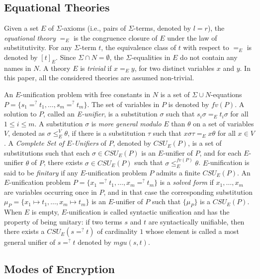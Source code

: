 \documentclass{easychair}
\newcommand{\CSU}[1]{\mathit{CSU_{#1}}}
\begin{document}
\subsection{Equational Theories}

Given a set $E$ of $\Sigma$-axioms (i.e., pairs of $\Sigma$-terms,
denoted by $l = r$), the \emph{equational theory} $=_E$ is the
congruence closure of $E$ under the law of substitutivity.  For any
$\Sigma$-term $t$, the equivalence class of $t$ with respect to $=_E$
is denoted by $[t]_E$. Since $\Sigma \cap N = \emptyset$, the 
$\Sigma$-equalities in $E$ do not contain any names in $N$.
A theory $E$ is
\emph{trivial} if $x=_E y$, for two distinct variables $x$ and $y$. In this
paper, all the considered theories are assumed non-trivial.

An $E$-unification problem with free constants in $N$ is a set of $\Sigma \cup N$-equations $P= \{ s_{1} =^{?} t_{1} , \dots , s_{m} =^{?} t_{m}\} $.
The set of variables in
$P$ is denoted by $fv(P)$.  A solution to $P$, called an
\emph{E-unifier\/}, is a substitution $\sigma$ such that $s_i \sigma
=_E^{} t_i \sigma$ for all $1 \leq i \leq m$.  A substitution $\sigma$
is \emph{more general modulo\/} $E$ than $\theta$ on a set of
variables $V$, denoted as $\sigma \leq_{E}^V \theta$, if there is a
substitution $\tau$ such that $x \sigma \tau =_{E} x \theta$ for all
$x \in V$.  A \emph{Complete Set of $E$-Unifiers} of $P$, denoted by
$\CSU{E}(P)$, is a set of substitutions such that each $\sigma \in
\CSU{E}(P)$ is an $E$-unifier of $P$, and for each $E$-unifier
$\theta$ of $P$, there exists $\sigma \in \CSU{E}(P)$ such that
$\sigma \leq_{E}^{fv(P)} \theta$.  $E$-unification is said to be
\emph{finitary} if any $E$-unification problem $P$ admits a finite
$\CSU{E}(P)$.  An $E$-unification problem $P = \{ x_{1} =^{?} t_{1} , \dots , x_{m} =^{?} t_{m}\}$ is a {\em solved form}
if  $x_1,\dots, x_m$ are variables occurring once in $P$, and in that
case the corresponding substitution $\mu_P = \{ x_{1} \mapsto t_{1} ,
\dots , x_{m} \mapsto t_{m} \}$ is an $E$-unifier of $P$ such that $\{ \mu_P \}$ is a $\CSU{E}(P)$.
When $E$ is empty, $E$-unification is called syntactic unification and
has the property of being unitary: if two terms $s$ and $t$ are
syntactically unifiable, then there exists a $\CSU{E}(s =^? t)$ of cardinality $1$ whose element is called a most general unifier of $s =^? t$ denoted by $mgu(s,t)$.


\subsection{Modes of Encryption}
\end{document}
